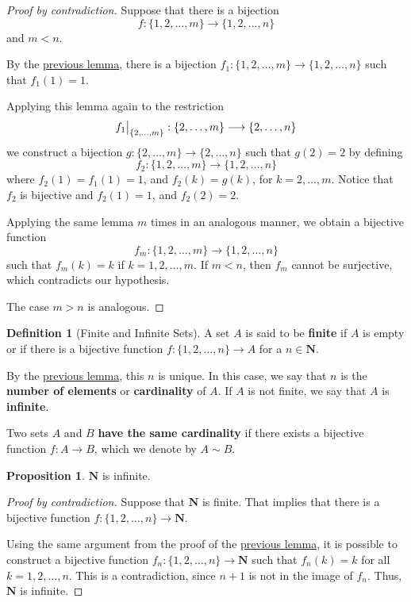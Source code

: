\documentclass[12pt,a4paper]{article}
\theoremstyle{definition}
\newtheorem{proposition}[theorem]{Proposition}
\newtheorem{definition}{Definition}[section]
\newcommand\restr[2]{{%
  \left.\kern-\nulldelimiterspace %
  #1 %
  \vphantom{\big|} %
  \right|_{#2} %
  }}
\begin{document}
\begin{proof}[Proof by contradiction]
	Suppose that there is a bijection 
	\[ f : \{ 1, 2, \ldots, m \} \longrightarrow \{ 1, 2, \ldots, n \} \]
	and $m<n$. 
	
	By the \hyperref[two-bij-fun]{previous lemma}, there is a bijection $f_1 : \{ 1, 2, \ldots, m \} \longrightarrow \{ 1, 2, \ldots, n \}$ such that $f_1(1) = 1$.
	
	Applying this lemma again to the restriction
	\[
	\restr{f_1}{\{ 2, \ldots, m \}} : \{ 2, \ldots, m \} \longrightarrow \{ 2, \ldots, n \}
	\]
	we construct a bijection $g : \{ 2, \ldots, m \} \longrightarrow \{ 2, \ldots, n \}$ such that $g(2) = 2$ by defining
	\[
	f_2 : \{ 1, 2, \ldots, m \} \longrightarrow \{ 1, 2, \ldots, n \}
	\]
	where $f_2(1) = f_1(1) = 1$, and $f_2(k) = g(k)$, for $k = 2, \ldots, m$. Notice that $f_2$ is bijective and $f_2(1) = 1$, and $f_2(2) = 2$.
	
	Applying the same lemma $m$ times in an analogous manner, we obtain a bijective function 
	\[ f_m : \{ 1, 2, \ldots, m \} \longrightarrow \{ 1, 2, \ldots, n \} \]
	such that $f_m(k) = k$ if $k = 1, 2, \ldots , m$. If $m<n$, then $f_m$ cannot be surjective, which contradicts our hypothesis.
	
	The case $m>n$ is analogous.
\end{proof}

\begin{definition}[Finite and Infinite Sets]
	A set $A$ is said to be \textbf{finite} if $A$ is empty or if there is a bijective function $ f : \{ 1, 2, \ldots, n \} \longrightarrow A$ for a $n \in \textbf{N}$.
	
	By the \hyperref[snd-lemma]{previous lemma}, this $n$ is unique. In this case, we say that $n$ is the \textbf{number of elements} or \textbf{cardinality} of $A$. If $A$ is not finite, we say that $A$ is \textbf{infinite}.
	
	Two sets $A$ and $B$ \textbf{have the same cardinality} if there exists a bijective function $f : A \longrightarrow B$, which we denote by $A \sim B$.
\end{definition}

\begin{proposition}\label{propninf}
	$\textbf{N}$ is infinite.
\end{proposition}

\begin{proof}[Proof by contradiction]
	Suppose that $\textbf{N}$ is finite. That implies that there is a bijective function $f : \{ 1, 2, \ldots, n \} \longrightarrow \textbf{N}$.
	
	Using the same argument from the proof of the \hyperref[snd-lemma]{previous lemma}, it is possible to construct a bijective function $f_n : \{ 1, 2, \ldots, n \} \longrightarrow \textbf{N}$ such that $f_n(k) = k$ for all $k = 1,2,\ldots , n$. This is a contradiction, since $n+1$ is not in the image of $f_n$. Thus, $\textbf{N}$ is infinite.
\end{proof}
\end{document}
